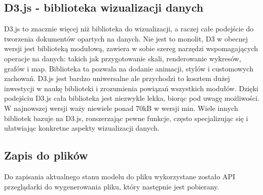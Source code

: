 \documentclass[12pt,a4paper]{article} %
\begin{document}
        \subsection{D3.js - biblioteka wizualizacji danych}
        
            D3.js to znacznie więcej niż biblioteka do wizualizacji, a raczej całe podejście do tworzenia dokumentów opartych na danych. Nie jest to monolit, D3 w obecnej wersji jest biblioteką modułową, zawiera w sobie szereg narzędzi wspomagających operacje na danych: takich jak przygotowanie skali, renderowanie wykresów, grafów i map. Biblioteka ta pozwala na dodanie animacji, stylów i customowych zachowań.
            D3.js jest bardzo uniwersalne ale przychodzi to kosztem dużej inwestycji w naukę biblioteki i zrozumienia powiązań wszystkich modułów. Dzięki podejściu D3.js cała biblioteka jest niezwykle lekka, biorąc pod uwagę możliwości. W najnowszej wersji waży niewiele ponad 70kB w wersji min. Wiele innych bibliotek bazuje na D3.js, rozszerzając pewne funkcje, często specjalizując się i ułatwiając konkretne aspekty wizualizacji danych. 
            
        \subsection{Zapis do plików}
            Do zapisania aktualnego stanu modelu do pliku wykorzystane zostało API przeglądarki do wygenerowania pliku, który następnie jest pobierany. 
            
\end{document}
